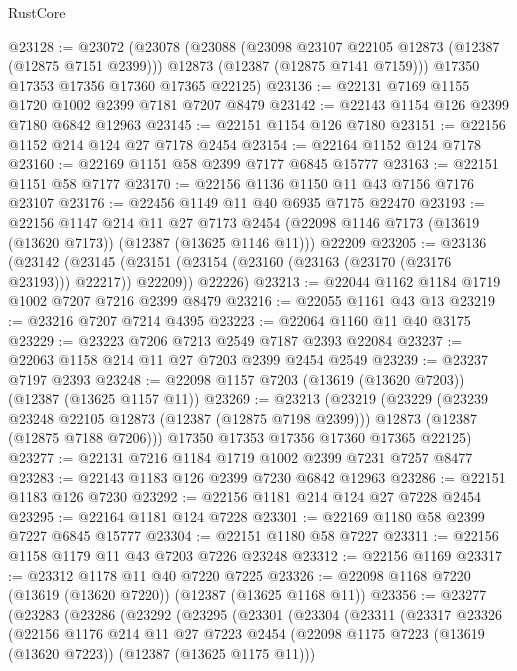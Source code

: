 \begin{lexlean}{RustCore}
\begin{coremodule}
@23128 := @23072
    (@23078
      (@23088
        (@23098 @23107 @22105 @12873 (@12387 (@12875 @7151 @2399)))
        @12873
        (@12387 (@12875 @7141 @7159)))
      @17350
      @17353
      @17356
      @17360
      @17365
      @22125)
@23136 := @22131 @7169 @1155 @1720 @1002 @2399 @7181 @7207 @8479
@23142 := @22143 @1154 @126 @2399 @7180 @6842 @12963
@23145 := @22151 @1154 @126 @7180
@23151 := @22156 @1152 @214 @124 @27 @7178 @2454
@23154 := @22164 @1152 @124 @7178
@23160 := @22169 @1151 @58 @2399 @7177 @6845 @15777
@23163 := @22151 @1151 @58 @7177
@23170 := @22156 @1136 @1150 @11 @43 @7156 @7176 @23107
@23176 := @22456 @1149 @11 @40 @6935 @7175 @22470
@23193 := @22156
    @1147
    @214
    @11
    @27
    @7173
    @2454
    (@22098 @1146 @7173 (@13619 (@13620 @7173)) (@12387 (@13625 @1146 @11)))
    @22209
@23205 := @23136
    (@23142
      (@23145 (@23151 (@23154 (@23160 (@23163 (@23170 (@23176 @23193))) @22217)) @22209))
      @22226)
@23213 := @22044 @1162 @1184 @1719 @1002 @7207 @7216 @2399 @8479
@23216 := @22055 @1161 @43 @13
@23219 := @23216 @7207 @7214 @4395
@23223 := @22064 @1160 @11 @40 @3175
@23229 := @23223 @7206 @7213 @2549 @7187 @2393 @22084
@23237 := @22063 @1158 @214 @11 @27 @7203 @2399 @2454 @2549
@23239 := @23237 @7197 @2393
@23248 := @22098 @1157 @7203 (@13619 (@13620 @7203)) (@12387 (@13625 @1157 @11))
@23269 := @23213
    (@23219
      (@23229
        (@23239 @23248 @22105 @12873 (@12387 (@12875 @7198 @2399)))
        @12873
        (@12387 (@12875 @7188 @7206)))
      @17350
      @17353
      @17356
      @17360
      @17365
      @22125)
@23277 := @22131 @7216 @1184 @1719 @1002 @2399 @7231 @7257 @8477
@23283 := @22143 @1183 @126 @2399 @7230 @6842 @12963
@23286 := @22151 @1183 @126 @7230
@23292 := @22156 @1181 @214 @124 @27 @7228 @2454
@23295 := @22164 @1181 @124 @7228
@23301 := @22169 @1180 @58 @2399 @7227 @6845 @15777
@23304 := @22151 @1180 @58 @7227
@23311 := @22156 @1158 @1179 @11 @43 @7203 @7226 @23248
@23312 := @22156 @1169
@23317 := @23312 @1178 @11 @40 @7220 @7225
@23326 := @22098 @1168 @7220 (@13619 (@13620 @7220)) (@12387 (@13625 @1168 @11))
@23356 := @23277
    (@23283
      (@23286
        (@23292
          (@23295
            (@23301
              (@23304
                (@23311
                  (@23317
                    @23326
                    (@22156
                      @1176
                      @214
                      @11
                      @27
                      @7223
                      @2454
                      (@22098 @1175 @7223 (@13619 (@13620 @7223)) (@12387 (@13625 @1175 @11)))

\end{coremodule}
\end{lexlean}
